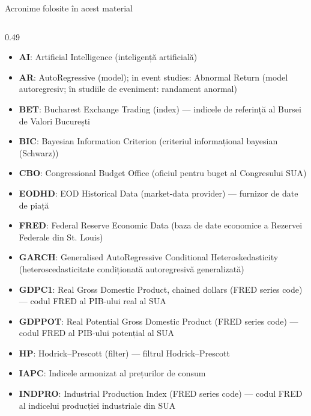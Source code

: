 {
\begin{frame}[noframenumbering]
    \titlepage
\end{frame}
}
\begin{frame}{Acronime folosite în acest material}
\begin{columns}[T]
\begin{column}{0.49\textwidth}
\begin{itemize}\setlength{\itemsep}{0pt}
    \item \textbf{AI}: Artificial Intelligence (inteligență artificială)
    \item \textbf{AR}: AutoRegressive (model); in event studies: Abnormal Return (model autoregresiv; în studiile de eveniment: randament anormal)
    \item \textbf{BET}: Bucharest Exchange Trading (index) — indicele de referință al Bursei de Valori București
    \item \textbf{BIC}: Bayesian Information Criterion (criteriul informațional bayesian (Schwarz))
    \item \textbf{CBO}: Congressional Budget Office (oficiul pentru buget al Congresului SUA)
    \item \textbf{EODHD}: EOD Historical Data (market-data provider) — furnizor de date de piață
    \item \textbf{FRED}: Federal Reserve Economic Data (baza de date economice a Rezervei Federale din St. Louis)
    \item \textbf{GARCH}: Generalised AutoRegressive Conditional Heteroskedasticity (heteroscedasticitate condiționată autoregresivă generalizată)
    \item \textbf{GDPC1}: Real Gross Domestic Product, chained dollars (FRED series code) — codul FRED al PIB-ului real al SUA
    \item \textbf{GDPPOT}: Real Potential Gross Domestic Product (FRED series code) — codul FRED al PIB-ului potențial al SUA
    \item \textbf{HP}: Hodrick–Prescott (filter) — filtrul Hodrick–Prescott
    \item \textbf{IAPC}: Indicele armonizat al prețurilor de consum
    \item \textbf{INDPRO}: Industrial Production Index (FRED series code) — codul FRED al indicelui producției industriale din SUA
\end{itemize}

\end{column}
\end{columns}
\end{frame}
